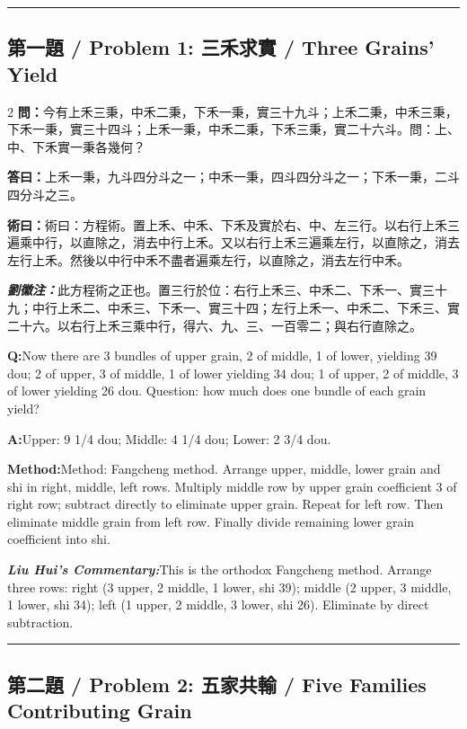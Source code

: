 \documentclass[11pt,a4paper]{article}
\newcommand{\cnwen}{\textcolor{cnlabelfg}{\textbf{問：}}}
\newcommand{\cnda}{\textbf{答曰：}}
\newcommand{\cnshu}{\textcolor{cnlabelfg}{\textbf{術曰：}}}
\newcommand{\cnzhu}{\textcolor{commentarycolor}{\textit{\textbf{劉徽注：}}}}
\newcommand{\enwen}{\textcolor{enlabelfg}{\textbf{Q:}}}
\newcommand{\enda}{\textcolor{enlabelfg}{\textbf{A:}}}
\newcommand{\enshu}{\textcolor{enlabelfg}{\textbf{Method:}}}
\newcommand{\enzhu}{\textcolor{enlabelfg}{\textit{\textbf{Liu Hui's Commentary:}}}}
\begin{document}
\bigskip\hrule\bigskip

\subsection{第一題 / Problem 1: 三禾求實 / Three Grains' Yield}

\begin{paracol}{2}
\switchcolumn[0]
\cnwen 今有上禾三秉，中禾二秉，下禾一秉，實三十九斗；上禾二秉，中禾三秉，下禾一秉，實三十四斗；上禾一秉，中禾二秉，下禾三秉，實二十六斗。問：上、中、下禾實一秉各幾何？

\cnda 上禾一秉，九斗四分斗之一；中禾一秉，四斗四分斗之一；下禾一秉，二斗四分斗之三。

\cnshu 術曰：方程術。置上禾、中禾、下禾及實於右、中、左三行。以右行上禾三遍乘中行，以直除之，消去中行上禾。又以右行上禾三遍乘左行，以直除之，消去左行上禾。然後以中行中禾不盡者遍乘左行，以直除之，消去左行中禾。

\cnzhu 此方程術之正也。置三行於位：右行上禾三、中禾二、下禾一、實三十九；中行上禾二、中禾三、下禾一、實三十四；左行上禾一、中禾二、下禾三、實二十六。以右行上禾三乘中行，得六、九、三、一百零二；與右行直除之。

\switchcolumn[1]
\enwen Now there are 3 bundles of upper grain, 2 of middle, 1 of lower, yielding 39 dou; 2 of upper, 3 of middle, 1 of lower yielding 34 dou; 1 of upper, 2 of middle, 3 of lower yielding 26 dou. Question: how much does one bundle of each grain yield?

\enda Upper: 9 1/4 dou; Middle: 4 1/4 dou; Lower: 2 3/4 dou.

\enshu Method: Fangcheng method. Arrange upper, middle, lower grain and shi in right, middle, left rows. Multiply middle row by upper grain coefficient 3 of right row; subtract directly to eliminate upper grain. Repeat for left row. Then eliminate middle grain from left row. Finally divide remaining lower grain coefficient into shi.

\enzhu This is the orthodox Fangcheng method. Arrange three rows: right (3 upper, 2 middle, 1 lower, shi 39); middle (2 upper, 3 middle, 1 lower, shi 34); left (1 upper, 2 middle, 3 lower, shi 26). Eliminate by direct subtraction.
\end{paracol}

\bigskip\hrule\bigskip

\subsection{第二題 / Problem 2: 五家共輸 / Five Families Contributing Grain}
\end{document}
